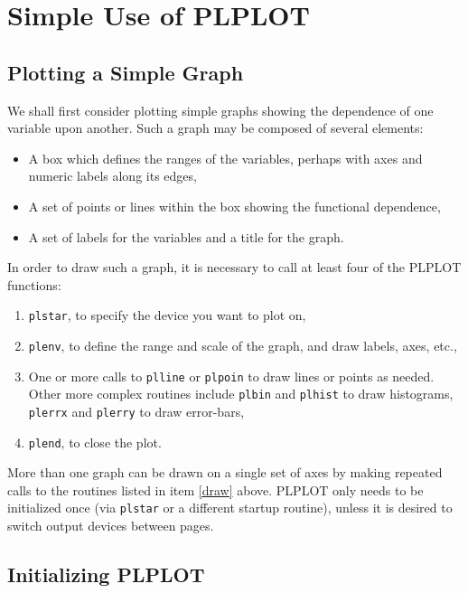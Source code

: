 
\chapter {Simple Use of PLPLOT} \label{simple}

\section {Plotting a Simple Graph}
We shall first consider plotting simple graphs showing the dependence
of one variable upon another. Such a graph may be composed of several
elements:
\begin{itemize}
   \item A box which defines the ranges of the variables, perhaps with axes
         and numeric labels along its edges, 
   \item A set of points or lines within the box showing the functional
         dependence, 
   \item A set of labels for the variables and a title for the graph.
\end{itemize}
In order to draw such a graph, it is necessary to call at least four of
the PLPLOT functions:
\begin{enumerate}
   \item {\tt plstar}, to specify the device you want to plot on, 
   \item {\tt plenv}, to define the range and scale of the graph, and
                      draw labels, axes, etc., 
   \item One or more calls to {\tt plline} or {\tt plpoin} to draw
         lines or points as needed. Other more complex routines include
         {\tt plbin} and {\tt plhist} to draw histograms, {\tt plerrx} and
         {\tt plerry} to draw error-bars, \label{draw}
   \item {\tt plend}, to close the plot.
\end{enumerate}
More than one graph can be drawn on a single set of axes by making
repeated calls to the routines listed in item \ref{draw} above.  PLPLOT 
only needs to be initialized once (via {\tt plstar} or a different startup
routine), unless it is desired to switch output devices between pages.


\section {Initializing PLPLOT} \label{startingup}

